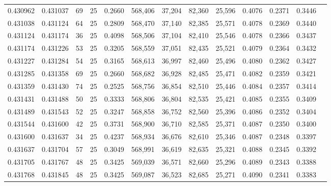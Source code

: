 \begin{tabular}{rrrrrrrrrrrrr}
0.430962 & 0.431037 &    69 &  25 &                                     0.2660 & 568,406 &  37,204 &  82,360 &  25,596 & 0.4076 & 0.2371 & 0.3446 \\
0.431038 & 0.431124 &    64 &  25 &                                     0.2809 & 568,470 &  37,140 &  82,385 &  25,571 & 0.4078 & 0.2369 & 0.3440 \\
0.431124 & 0.431174 &    36 &  25 &                                     0.4098 & 568,506 &  37,104 &  82,410 &  25,546 & 0.4078 & 0.2366 & 0.3437 \\
0.431174 & 0.431226 &    53 &  25 &                                     0.3205 & 568,559 &  37,051 &  82,435 &  25,521 & 0.4079 & 0.2364 & 0.3432 \\
0.431227 & 0.431284 &    54 &  25 &                                     0.3165 & 568,613 &  36,997 &  82,460 &  25,496 & 0.4080 & 0.2362 & 0.3427 \\
0.431285 & 0.431358 &    69 &  25 &                                     0.2660 & 568,682 &  36,928 &  82,485 &  25,471 & 0.4082 & 0.2359 & 0.3421 \\
0.431359 & 0.431430 &    74 &  25 &                                     0.2525 & 568,756 &  36,854 &  82,510 &  25,446 & 0.4084 & 0.2357 & 0.3414 \\
0.431431 & 0.431488 &    50 &  25 &                                     0.3333 & 568,806 &  36,804 &  82,535 &  25,421 & 0.4085 & 0.2355 & 0.3409 \\
0.431489 & 0.431543 &    52 &  25 &                                     0.3247 & 568,858 &  36,752 &  82,560 &  25,396 & 0.4086 & 0.2352 & 0.3404 \\
0.431544 & 0.431600 &    42 &  25 &                                     0.3731 & 568,900 &  36,710 &  82,585 &  25,371 & 0.4087 & 0.2350 & 0.3400 \\
0.431600 & 0.431637 &    34 &  25 &                                     0.4237 & 568,934 &  36,676 &  82,610 &  25,346 & 0.4087 & 0.2348 & 0.3397 \\
0.431637 & 0.431704 &    57 &  25 &                                     0.3049 & 568,991 &  36,619 &  82,635 &  25,321 & 0.4088 & 0.2345 & 0.3392 \\
0.431705 & 0.431767 &    48 &  25 &                                     0.3425 & 569,039 &  36,571 &  82,660 &  25,296 & 0.4089 & 0.2343 & 0.3388 \\
0.431768 & 0.431845 &    48 &  25 &                                     0.3425 & 569,087 &  36,523 &  82,685 &  25,271 & 0.4090 & 0.2341 & 0.3383 \\

\end{tabular}

